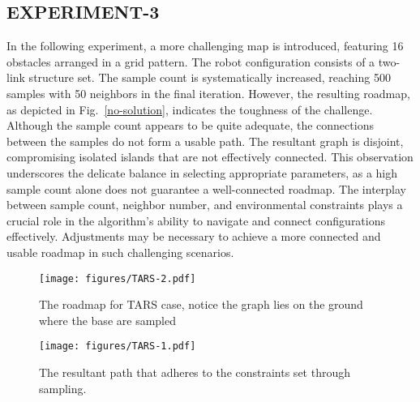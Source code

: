 \documentclass{IEEEtaes}
\begin{document}
\subsection{\fontsize{10}{13}\selectfont EXPERIMENT-3}
In the following experiment, a more challenging map is introduced, featuring 16 obstacles arranged in a grid pattern. The robot configuration consists of a two-link structure set. The sample count is systematically increased, reaching 500 samples with 50 neighbors in the final iteration.
However, the resulting roadmap, as depicted in Fig.~\ref{no-solution}, indicates the toughness of the challenge. Although the sample count appears to be quite adequate, the connections between the samples do not form a usable path. The resultant graph is disjoint, compromising isolated islands that are not effectively connected. This observation underscores the delicate balance in selecting appropriate parameters, as a high sample count alone does not guarantee a well-connected roadmap. The interplay between sample count, neighbor number, and environmental constraints plays a crucial role in the algorithm's ability to navigate and connect configurations effectively. Adjustments may be necessary to achieve a more connected and usable roadmap in such challenging scenarios.

\begin{figure*}[bh!]
    \begin{center}
        \texttt{[image: figures/TARS-2.pdf]}
     \end{center}
     \vspace{-1em}
     \caption{The roadmap for TARS case, notice the graph lies on the ground where the base are sampled}
     \label{tars-2}
     \vspace{-1em}
\end{figure*}

\begin{figure*}[bh!]
    \begin{center}
        \texttt{[image: figures/TARS-1.pdf]}
     \end{center}
     \vspace{-1em}
     \caption{The resultant path that adheres to the constraints set through sampling.}
     \label{tars-1}
     \vspace{-1em}
\end{figure*}
\end{document}
